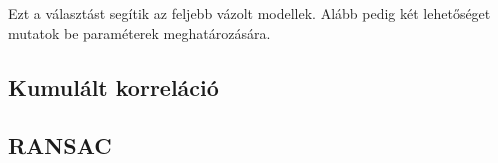 Ezt a választást segítik az feljebb vázolt modellek.
Alább pedig két lehetőséget mutatok be paraméterek meghatározására.

\subsection{Kumulált korreláció}\label{sect:CumCorr}



\subsection{RANSAC}\label{sect:ransac}
